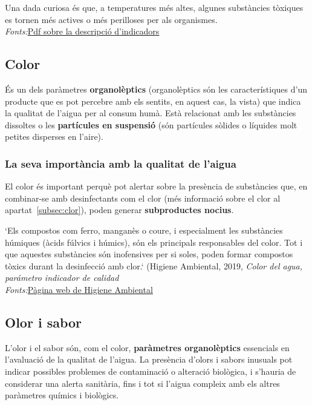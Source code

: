 Una dada curiosa és que, a temperatures més altes, algunes substàncies tòxiques es tornen més actives o més perilloses per als organismes.\\
\textit{Fonts:}\href{https://www.ucm.es/data/cont/docs/952-2015-02-14-Temperatura\%20f26.pdf}{Pdf sobre la descripció d'indicadors}\\

\subsection{Color} \label{subsec:color}
És un dels paràmetres \textbf{organolèptics} (organolèptics són les característiques d'un producte que es pot percebre amb els sentits, en aquest cas, la vista) que indica la qualitat de l'aigua per al consum humà. Està relacionat amb les substàncies dissoltes o les \textbf{partícules en suspensió} (són partícules sòlides o líquides molt petites disperses en l’aire).
\subsubsection{La seva importància amb la qualitat de l'aigua}
El color és important perquè pot alertar sobre la presència de substàncies que, en combinar-se amb desinfectants com el clor (més informació sobre el clor al apartat~\ref{subsec:clor}), poden generar \textbf{subproductes nocius}.

`Els compostos com ferro, manganès o coure, i especialment les substàncies húmiques (àcids fúlvics i húmics), són els principals responsables del color. Tot i que aquestes substàncies són inofensives per si soles, poden formar compostos tòxics durant la desinfecció amb clor.` (Higiene Ambiental, 2019, \textit{Color del agua, parámetro indicador de calidad}\\
 \textit{Fonts:}\href{https://higieneambiental.com/aire-agua-y-legionella/color-del-agua-parametro-indicador-de-calidad}{Pàgina web de Higiene Ambiental}\\

\subsection{Olor i sabor} \label{subsec:olorisabor}
L’olor i el sabor són, com el color, \textbf{paràmetres organolèptics} essencials en l’avaluació de la qualitat de l’aigua. La presència d’olors i sabors inusuals pot indicar possibles problemes de contaminació o alteració biològica, i s’hauria de considerar una alerta sanitària, fins i tot si l’aigua compleix amb els altres paràmetres químics i biològics.

